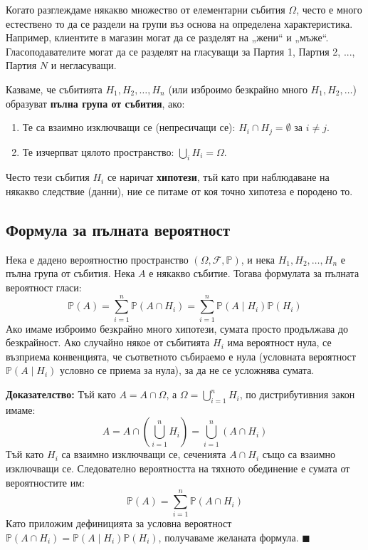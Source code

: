 \documentclass{article}
\begin{document}
Когато разглеждаме някакво множество от елементарни събития $\Omega$, често е много естествено то да се раздели на групи въз основа на определена характеристика. Например, клиентите в магазин могат да се разделят на „жени“ и „мъже“. Гласоподавателите могат да се разделят на гласуващи за Партия 1, Партия 2, ..., Партия $N$ и негласуващи.

Казваме, че събитията $H_1, H_2, \dots, H_n$ (или изброимо безкрайно много $H_1, H_2, \dots$) образуват \textbf{пълна група от събития}, ако:
\begin{enumerate}
    \item Те са взаимно изключващи се (непресичащи се): $H_i \cap H_j = \emptyset$ за $i \neq j$.
    \item Те изчерпват цялото пространство: $\bigcup_{i} H_i = \Omega$.
\end{enumerate}
Често тези събития $H_i$ се наричат \textbf{хипотези}, тъй като при наблюдаване на някакво следствие (данни), ние се питаме от коя точно хипотеза е породено то.

\subsection{Формула за пълната вероятност}

Нека е дадено вероятностно пространство $(\Omega, \mathcal{F}, \mathbb{P})$, и нека $H_1, H_2, \dots, H_n$ е пълна група от събития. Нека $A$ е някакво събитие. Тогава формулата за пълната вероятност гласи:
\[
\mathbb{P}(A) = \sum_{i=1}^n \mathbb{P}(A \cap H_i) = \sum_{i=1}^n \mathbb{P}(A \mid H_i)\mathbb{P}(H_i)
\]
Ако имаме изброимо безкрайно много хипотези, сумата просто продължава до безкрайност.
Ако случайно някое от събитията $H_i$ има вероятност нула, се възприема конвенцията, че съответното събираемо е нула (условната вероятност $\mathbb{P}(A \mid H_i)$ условно се приема за нула), за да не се усложнява сумата.

\textbf{Доказателство:}
Тъй като $A = A \cap \Omega$, а $\Omega = \bigcup_{i=1}^n H_i$, по дистрибутивния закон имаме:
\[
A = A \cap \left( \bigcup_{i=1}^n H_i \right) = \bigcup_{i=1}^n (A \cap H_i)
\]
Тъй като $H_i$ са взаимно изключващи се, сеченията $A \cap H_i$ също са взаимно изключващи се. Следователно вероятността на тяхното обединение е сумата от вероятностите им:
\[
\mathbb{P}(A) = \sum_{i=1}^n \mathbb{P}(A \cap H_i)
\]
Като приложим дефиницията за условна вероятност $\mathbb{P}(A \cap H_i) = \mathbb{P}(A \mid H_i)\mathbb{P}(H_i)$, получаваме желаната формула. $\blacksquare$
\end{document}

